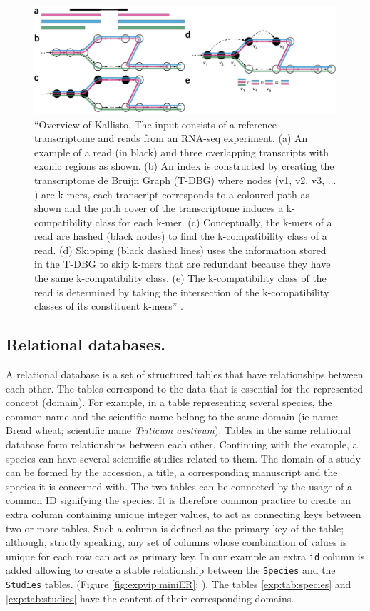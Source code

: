 \begin{figure}
\includegraphics[width=1\textwidth]{LitReview/Figures/kallisto.pdf}
\caption[Overview of Kallisto.]{``Overview of Kallisto. The input consists of a reference transcriptome and reads from an RNA-seq experiment. (a) An example of a read (in black) and three overlapping transcripts with exonic regions as shown. (b) An index is constructed by creating the transcriptome de Bruijn Graph (T-DBG) where
nodes (v1, v2, v3, ... ) are k-mers, each transcript corresponds to a coloured path as shown and the path cover of the transcriptome induces a k-compatibility class for each k-mer. (c) Conceptually, the k-mers of a read are hashed (black nodes) to find the k-compatibility class of a read. (d) Skipping (black dashed lines) uses the information stored in the T-DBG to skip k-mers that are redundant because they have the same k-compatibility class. (e) The k-compatibility class of the read is determined by taking the intersection of the k-compatibility classes of its constituent k-mers'' \citep{Bray2016}.}
\label{fig:exp:kallisto}
\end{figure}


\subsection{Relational databases.}
A relational database is a set of structured tables that have relationships between each other. 
The tables correspond to the data that is essential for the represented concept (domain).
For example, in a table representing several species, the common name and the scientific name belong to the same domain (ie name: Bread wheat; scientific name \textit{Triticum aestivum}). 
Tables in the same relational database form relationships between each other. 
Continuing with the example, a species can have several scientific studies related to them. 
The domain of a study can be formed by the accession, a title, a corresponding manuscript and the species it is concerned with. The two tables can be connected by the usage of a common ID signifying the species. It is therefore common practice to create an extra column containing unique integer values, to act as connecting keys between two or more tables. Such a column is defined as the primary key of the table; although, strictly speaking, any set of columns whose combination of values is unique for each row can act as primary key. 
In our example an extra \texttt{id} column is added allowing to create a stable relationship between the \verb|Species| and the \verb|Studies| tables.
 (Figure \ref{fig:expvip:miniER}; \citealt{Codd1970}).
The tables \ref{exp:tab:species} and \ref{exp:tab:studies} have the content of their corresponding domains. 

